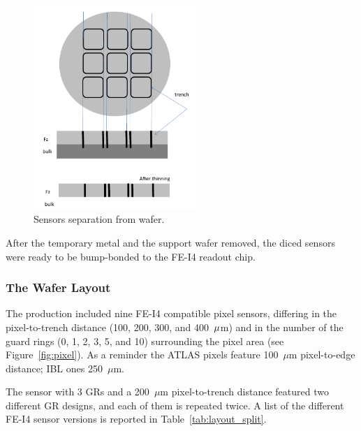 \begin{figure}[!htpb]
\centering
\includegraphics[width=0.55\textwidth]{edgelesslapping.pdf}
\caption{Sensors separation from wafer.}
\label{fig:lapping}
\end{figure}


After the temporary metal and the support wafer removed, the diced sensors were ready to be 
bump-bonded to the FE-I4 readout chip.


\subsubsection{The Wafer Layout}
The production included nine FE-I4 compatible pixel sensors, differing in the pixel-to-trench distance (100, 200, 300, and 400~${\rm \mu}$m) and in the number of the guard rings (0, 1, 2, 3, 5, and 10)
surrounding the pixel area (see Figure~\ref{fig:pixel}). As a reminder the ATLAS pixels feature 
100~$\mu$m pixel-to-edge distance; IBL ones 250~$\mu$m.

The sensor with 3 GRs and a 200~$\mu$m pixel-to-trench distance featured two different GR designs, and
each of them is repeated twice.
A list of the different FE-I4 sensor versions is reported in Table~\ref{tab:layout_split}.


